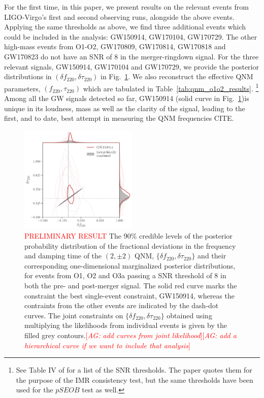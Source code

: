 \documentclass[twocolumn,prd,superscriptaddress,amsfonts,amssymb,amsmath,preprintnumbers]{revtex4-1}
\newcommand{\abhi}[1]{\textcolor{red}{[\textit{AG: #1}]}}
\newcommand{\df}[1]{\delta f_{\text{#1}}}
\newcommand{\dtau}[1]{\delta \tau_{\text{#1}}}
\newcommand{\fngr}[1]{f_{\text{#1}}}
\newcommand{\taungr}[1]{\tau_{\text{#1}}}
\begin{document}
For the first time, in this paper, we present results on the relevant events from LIGO-Virgo's first and second observing runs, alongside the above events. Applying the same thresholds as above, we find three additional events which could be included in the analysis: GW150914, GW170104, GW170729. The other high-mass events from O1-O2, GW170809, GW170814, GW170818 and GW170823 do not have an SNR of $8$ in the merger-ringdown signal. For the three relevant signals, GW150914, GW170104 and GW170729, we provide the posterior distributions in $(\df{220}, \dtau{220})$ in Fig.~\ref{fig:o1o2_events}. We also reconstruct the effective QNM parameters, $(\fngr{220}, \taungr{220})$ which are tabulated in Table~\ref{tab:qnm_o1o2_results}. \footnote{See Table IV of \cite{Abbott:2020jks} for a list of the SNR thresholds. The paper quotes them for the purpose of the IMR consistency test, but the same thresholds have been used for the $pSEOB$ test as well.} Among all the GW signals detected so far, GW150914 (solid curve in Fig.~\ref{fig:o1o2_events})is unique in its loudness, mass as well as the clarity of the signal, leading to the first, and to date, best attempt in measuring the QNM frequencies CITE.

\begin{figure}[h!]
	\includegraphics[width=0.5\textwidth]{figures/rin_pseob_results.pdf}
	\caption{\textcolor{red}{PRELIMINARY RESULT} The 90\% credible levels of the posterior probability distribution of the fractional deviations in the frequency and damping time of the $(2,\pm 2)$ QNM, $\{\df{220},\dtau{220}\}$ and their corresponding one-dimensional marginalized posterior distributions, for events from O1, O2 and O3a passing a SNR threshold of $8$ in both the pre- and post-merger signal. The solid red curve marks the constraint the best single-event constraint, GW150914, whereas the contraints from the other events are indicated by the dash-dot curves. The joint constraints on $\{\df{220},\dtau{220}\}$ obtained using multiplying the likelihoods from individual events is given by the filled grey contours.\abhi{add curves from joint likelihood}\abhi{add a hierarchical curve if we want to include that analysis}}
	\label{fig:o1o2_events}
\end{figure}
\end{document}
